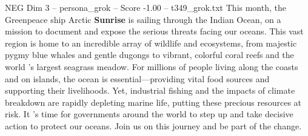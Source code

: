 \begin{textsample}{NEG Dim 3 – persona\_grok – Score -1.00 – t349\_grok.txt}  \label{ex:f3_neg_029}
This month, the Greenpeace ship Arctic \textbf{Sunrise} is sailing through the Indian Ocean, on a mission to document and expose the serious threats facing our oceans.
This vast region is home to an incredible array of wildlife and ecosystems, from majestic pygmy blue whales and gentle dugongs to vibrant, colorful coral reefs and the world 's largest seagrass meadow.
For millions of people living along the coasts and on islands, the ocean is essential—providing vital food sources and supporting their livelihoods.
Yet, industrial fishing and the impacts of climate breakdown are rapidly depleting marine life, putting these precious resources at risk.
It 's time for governments around the world to step up and take decisive action to protect our oceans.
Join us on this journey and be part of the change.

\end{textsample}
